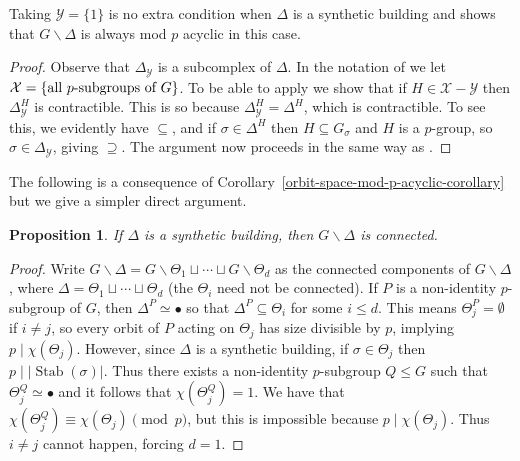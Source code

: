 \documentclass[12pt]{amsart}
\theoremstyle{plain}
\newtheorem{proposition}[theorem]{Proposition}
\theoremstyle{definition}
\theoremstyle{remark}
\numberwithin{equation}{section}
\def\calX{{\mathcal X}}
\def\calY{{\mathcal Y}}
\newcommand{\bs}{\backslash}
\DeclareMathOperator{\Stab}{Stab}
\begin{document}
Taking $\calY=\{1\}$ is no extra condition when $\Delta$ is a synthetic building and shows that $G\backslash\Delta$ is always mod $p$ acyclic in this case.

\begin{proof}
Observe that $\Delta_\calY$ is a subcomplex of $\Delta$. In the notation of  \cite[Cor. 2.6.1]{Web1991} we let $\calX= \{ \hbox{all $p$-subgroups of }G\}$. To be able to apply \cite[Thm. A]{Web1991} we show that if $H\in\calX - \calY$ then $\Delta_\calY^H$ is contractible. This is so because $\Delta_\calY^H = \Delta^H$, which is contractible. To see this, we evidently have $\subseteq$, and if $\sigma\in\Delta^H$ then $H\subseteq G_\sigma$ and $H$ is a $p$-group, so $\sigma\in\Delta_\calY$, giving $\supseteq$. The argument now proceeds in the same way as  \cite[Cor. 2.6.1]{Web1991}.
\end{proof}

The following is a consequence of Corollary~\ref{orbit-space-mod-p-acyclic-corollary} but we give a simpler direct argument.

\begin{proposition}\label{prop:sb_ctd_orbit_space}
    If $\Delta$ is a synthetic building, then $G\bs\Delta$ is connected.
\end{proposition}
\begin{proof}
    Write $G\bs\Delta=G\bs\Theta_1\sqcup\cdots\sqcup G\bs\Theta_d$ as the connected components of $G\bs\Delta$, where $\Delta=\Theta_1\sqcup\cdots\sqcup\Theta_d$ (the $\Theta_i$ need not be connected). If $P$ is a non-identity $p$-subgroup of $G$, then $\Delta^P\simeq\bullet$ so that $\Delta^P\subseteq\Theta_i$ for some $i\leq d$. This means $\Theta_j^P=\emptyset$ if $i\ne j$, so every orbit of $P$ acting on $\Theta_j$ has size divisible by $p$, implying $p\mid \chi(\Theta_j)$. However, since $\Delta$ is a synthetic building, if $\sigma\in\Theta_j$ then $p\mid|\Stab(\sigma)|$. Thus there exists a non-identity $p$-subgroup $Q\leq G$ such that $\Theta_j^Q\simeq\bullet$ and it follows that $\chi(\Theta_j^Q)=1$. We have that $\chi(\Theta_j^Q)\equiv \chi(\Theta_j)\pmod{p}$, but this is impossible because $p\mid \chi(\Theta_j)$. Thus $i\ne j$ cannot happen, forcing $d=1$.
\end{proof}

\end{document}
